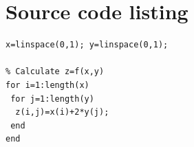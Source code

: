 \newpage

\section{Source code listing}
\begin{lstlisting}[frame=single]
% Generate x- and y-nodes
x=linspace(0,1); y=linspace(0,1);

% Calculate z=f(x,y)
for i=1:length(x)
 for j=1:length(y)
  z(i,j)=x(i)+2*y(j);
 end
end
\end{lstlisting}


